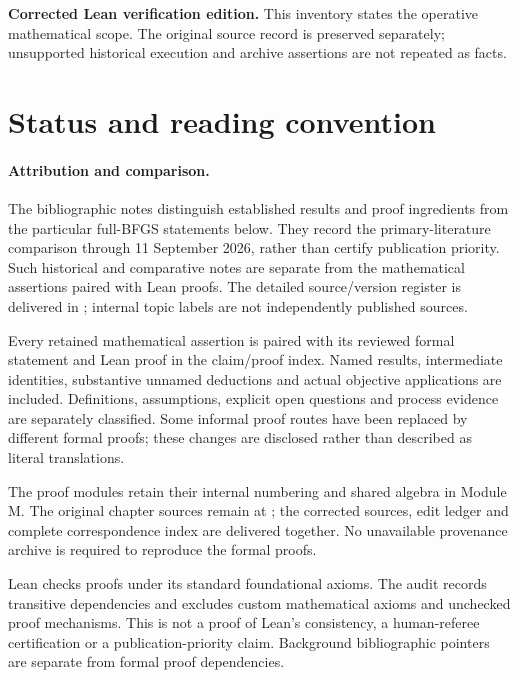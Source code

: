 \textbf{Corrected Lean verification edition.} This inventory states the operative mathematical scope. The original source record is preserved separately; unsupported historical execution and archive assertions are not repeated as facts.

\section*{Status and reading convention}\label{status-and-reading-convention}
\paragraph{Attribution and comparison.}
The bibliographic notes distinguish established results and proof ingredients from the particular full-BFGS statements below. They record the primary-literature comparison through 11 September 2026, rather than certify publication priority. Such historical and comparative notes are separate from the mathematical assertions paired with Lean proofs. The detailed source/version register is delivered in ; internal topic labels are not independently published sources.


Every retained mathematical assertion is paired with its reviewed formal statement and Lean proof in the claim/proof index. Named results, intermediate identities, substantive unnamed deductions and actual objective applications are included. Definitions, assumptions, explicit open questions and process evidence are separately classified. Some informal proof routes have been replaced by different formal proofs; these changes are disclosed rather than described as literal translations.

The proof modules retain their internal numbering and shared algebra in Module M. The original chapter sources remain at ; the corrected sources, edit ledger and complete correspondence index are delivered together. No unavailable provenance archive is required to reproduce the formal proofs.

Lean checks proofs under its standard foundational axioms. The audit records transitive dependencies and excludes custom mathematical axioms and unchecked proof mechanisms. This is not a proof of Lean's consistency, a human-referee certification or a publication-priority claim. Background bibliographic pointers are separate from formal proof dependencies.
